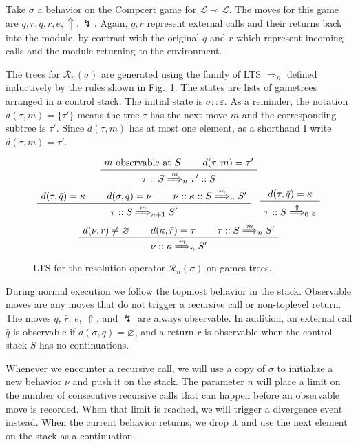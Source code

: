 \documentclass[11pt]{article}
\begin{document}
Take $\sigma$ a behavior on the Compcert game for
$\mathcal{L} \multimap \mathcal{L}$.
The moves for this game are $q, r, \bar{q}, \bar{r}, e, \Uparrow, \lightning$.
Again, $\bar{q}, \bar{r}$ represent external calls and their returns
back into the module,
by contrast with the original $q$ and $r$ which represent
incoming calls and the module returning to the environment.

The trees for $\mathcal{R}_n(\sigma)$ are generated
using the family of LTS $\Rightarrow_n$ defined inductively
by the rules shown in Fig.~\ref{fig:res}.
The states are lists of gametrees arranged in a control stack.
The initial state is $\sigma :: \varepsilon$.
As a reminder,
the notation $d(\tau, m) = \{\tau'\}$ means
the tree $\tau$ has the next move $m$
and the corresponding subtree is $\tau'$.
Since $d(\tau, m)$ has at most one element,
as a shorthand I write $d(\tau, m) = \tau'$.

\begin{figure}
\[
  \AxiomC{$m \mbox{ observable at } S$}
  \AxiomC{$d(\tau, m) = \tau'$}
  \BinaryInfC{$\tau :: S \stackrel{m}{\Longrightarrow}_n \tau' :: S$}
  \DisplayProof
\]
\[
  \AxiomC{$d(\tau, \bar{q}) = \kappa$}
  \AxiomC{$d(\sigma, q) = \nu$}
  \AxiomC{$\nu :: \kappa :: S \stackrel{m}{\Longrightarrow}_n S'$}
  \TrinaryInfC{$\tau :: S \stackrel{m}{\Longrightarrow}_{n+1} S'$}
  \DisplayProof
  \quad
  \AxiomC{$d(\tau, \bar{q}) = \kappa$}
  \UnaryInfC{$\tau :: S \stackrel{\Uparrow}{\Longrightarrow}_0 \varepsilon$}
  \DisplayProof
\]
\vspace{.5em}
\[
  \AxiomC{$d(\nu, r) \ne \varnothing$}
  \AxiomC{$d(\kappa, \bar{r}) = \tau$}
  \AxiomC{$\tau :: S \stackrel{m}{\Longrightarrow}_n S'$}
  \TrinaryInfC{$\nu :: \kappa \stackrel{m}{\Longrightarrow}_n S'$}
  \DisplayProof
\]
\caption{LTS for the resolution operator
  $\mathcal{R}_n(\sigma)$ on games trees.}
\label{fig:res}
\end{figure}

During normal execution we follow the topmost behavior in the stack.
Observable moves are any moves that do not trigger a recursive call
or non-toplevel return.
The moves $q$, $\bar{r}$, $e$, $\Uparrow$, and $\lightning$
are always observable.
In addition,
an external call $\bar{q}$
is observable if $d(\sigma, q) = \varnothing$,
and a return $r$
is observable when the control stack $S$ has no continuations.

Whenever we encounter a recursive call,
we will use a copy of $\sigma$
to initialize a new behavior $\nu$ and push it on the stack.
The parameter $n$ will place a limit on
the number of consecutive recursive calls that can happen
before an observable move is recorded.
When that limit is reached,
we will trigger a divergence event instead.
When the current behavior returns,
we drop it and use the next element on the stack as a continuation.
\end{document}
